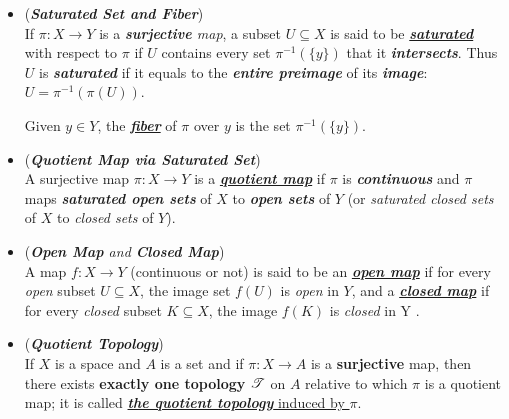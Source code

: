 \documentclass[11pt]{article}
\begin{document}
\begin{itemize}
\item \begin{definition} (\emph{\textbf{Saturated Set and Fiber}})\\
If $\pi: X \rightarrow Y$ is a \emph{\textbf{surjective} map}, a subset $U \subseteq X$ is said to be \underline{\emph{\textbf{saturated}}} with respect to $\pi$ if $U$ contains every set $\pi^{-1}(\{y\})$ that it \emph{\textbf{intersects}}. Thus $U$ is \emph{\textbf{saturated}} if it equals to the \textbf{\emph{entire preimage}} of its \emph{\textbf{image}}: $U =\pi^{-1}(\pi(U))$. 

Given $y \in Y$, the \underline{\emph{\textbf{fiber}}} of $\pi$ over $y$ is the set $\pi^{-1}(\{y\})$. 
\end{definition}

\item \begin{definition} (\emph{\textbf{Quotient Map via Saturated Set}})\\
A surjective map $\pi : X \rightarrow Y$ is a \underline{\emph{\textbf{quotient map}}} if $\pi$ is \emph{\textbf{continuous}} and $\pi$ maps \emph{\textbf{saturated open sets}} of $X$ to \emph{\textbf{open sets}} of $Y$ (or \emph{saturated closed sets} of $X$ to \emph{closed sets} of $Y$).
\end{definition}


\item \begin{definition} (\emph{\textbf{Open Map} and \textbf{Closed Map}})\\
A map $f: X \rightarrow Y$ (continuous or not) is said to be an \underline{\emph{\textbf{open map}}} if for every \emph{open} subset $U \subseteq X$, the image set $f(U)$ is \emph{open} in $Y$, and a  \underline{\emph{\textbf{closed map}}} if for every \emph{closed} subset $K \subseteq X$, the image $f(K)$ is \emph{closed} in Y . 
\end{definition}


\item \begin{definition} (\emph{\textbf{Quotient Topology}})\\
If $X$ is a space and $A$ is a set and if $\pi: X \rightarrow A$ is a \textbf{surjective} map, then there exists \textbf{exactly one topology} ${\mathscr T}$ on $A$ relative to which $\pi$ is a quotient map; it is called \underline{\emph{\textbf{the quotient topology}} induced by $\pi$}.
\end{definition}


\end{itemize}
\end{document}
